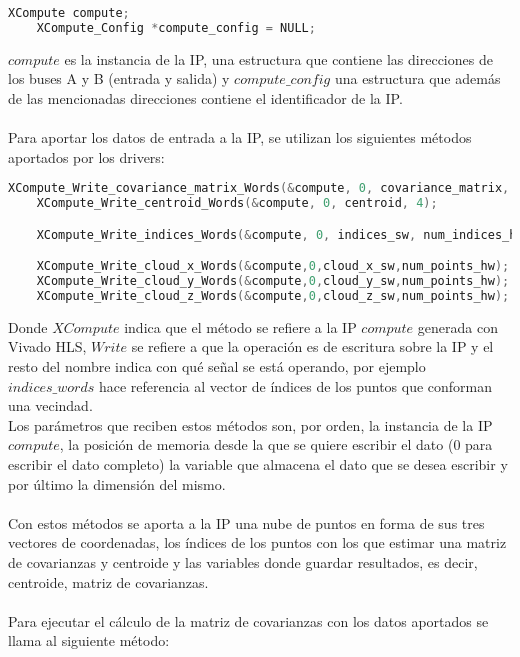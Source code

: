 \begin{lstlisting}[language=C++,breaklines]
	XCompute compute;
	XCompute_Config *compute_config = NULL;
\end{lstlisting}

$compute$ es la instancia de la IP, una estructura que contiene las direcciones de los buses A y B (entrada y salida) y $compute\_config$ una estructura que además de las mencionadas direcciones contiene el identificador de la IP. 
\\
\\
Para aportar los datos de entrada a la IP, se utilizan los siguientes métodos aportados por los drivers:

\begin{lstlisting}[language=C++,breaklines]
	XCompute_Write_covariance_matrix_Words(&compute, 0, covariance_matrix, 9);
	XCompute_Write_centroid_Words(&compute, 0, centroid, 4);

	XCompute_Write_indices_Words(&compute, 0, indices_sw, num_indices_hw);

	XCompute_Write_cloud_x_Words(&compute,0,cloud_x_sw,num_points_hw);
	XCompute_Write_cloud_y_Words(&compute,0,cloud_y_sw,num_points_hw);
	XCompute_Write_cloud_z_Words(&compute,0,cloud_z_sw,num_points_hw);
\end{lstlisting}

Donde $XCompute$ indica que el método se refiere a la IP $compute$ generada con Vivado HLS, $Write$ se refiere a que la operación es de escritura sobre la IP y el resto del nombre indica con qué señal se está operando, por ejemplo $indices\_words$ hace referencia al vector de índices de los puntos que conforman una vecindad. 
\\
Los parámetros que reciben estos métodos son, por orden, la instancia de la IP $compute$, la posición de memoria desde la que se quiere escribir el dato (0 para escribir el dato completo) la variable que almacena el dato que se desea escribir y por último la dimensión del mismo.
\\
\\
Con estos métodos se aporta a la IP una nube de puntos en forma de sus tres vectores de coordenadas, los índices de los puntos con los que estimar una matriz de covarianzas y centroide y las variables donde guardar resultados, es decir, centroide, matriz de covarianzas.
\\
\\
Para ejecutar el cálculo de la matriz de covarianzas con los datos aportados se llama al siguiente método:

